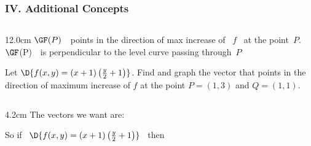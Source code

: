 \begin{frame}
\frametitle{IV. Additional Concepts}
\scriptsize
\begin{columns}
\begin{column}{12.0cm}
	\THM \OBUL $\GF(P)$ \,\, points in the direction of max increase of \, $f$ \, at the point \,$P$.  \\
	\vspace{0.1cm}
	\hspace{0.73cm} \OBUL $\GF$(P) \,\, is perpendicular to the level curve passing through \,$P$
	
\vspace{0.2cm}

\EX Let $\D{f(x,y) = (x+1)\left(\frac{y}{2}+1\right)}$. Find and graph the vector that points in the direction of \NEWLINE maximum increase of $f$ at the point $P = (1,3)$ and $Q = (1,1)$.

\vspace{0.2cm}

\begin{columns}
\begin{column}{4.2cm}
The vectors we want are: 

\vspace{0.1cm}
 
\hspace{1.4cm} 

\vspace{0.2cm}

So if \, $\D{f(x,y) = (x+1)\left(\frac{y}{2}+1\right)}$ \, then

\vspace{0.4cm}


\vspace{0.2cm}

%


%

\vspace{0.5cm}


\end{column}
\end{columns}
\end{column}
\end{columns}
\end{frame}
